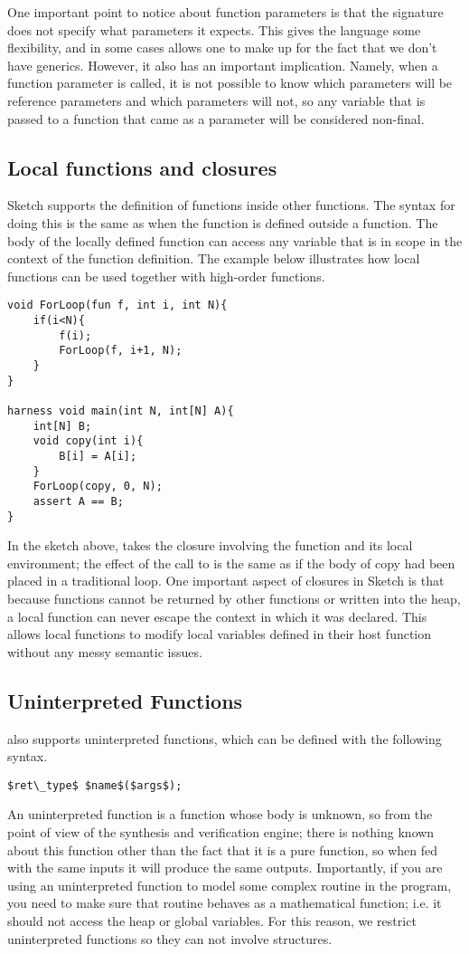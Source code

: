 One important point to notice about function parameters is that the signature does not specify what parameters it expects. This gives the language some flexibility, and in some cases allows one to make up for the fact that we don't have generics. However, it also has an important implication. Namely, when a function parameter is called, it is not possible to know which parameters will be reference parameters and which parameters will not, so any variable that is passed to a function that came as a parameter will be considered non-final.

\subsection{Local functions and closures}
Sketch supports the definition of functions inside other functions. The syntax for doing this is the same as when the function is defined outside a function. The body of the locally defined function can access any variable that is in scope in the context of the function definition. The example below illustrates how local functions can be used together with high-order functions. 

\begin{lstlisting}
void ForLoop(fun f, int i, int N){
	if(i<N){
		f(i);
		ForLoop(f, i+1, N);
	}
}

harness void main(int N, int[N] A){
	int[N] B;
	void copy(int i){
		B[i] = A[i];
	}
	ForLoop(copy, 0, N);
	assert A == B;
}
\end{lstlisting}
	
In the sketch above,  takes the closure involving the function  and its local environment; the effect of the call to  is the same as if the body of copy had been placed in a traditional  loop. 
One important aspect of closures in Sketch is that because functions cannot be returned by other functions or written into the heap, a local function can never escape the context in which it was declared. This allows local functions to modify local variables defined in their host function without any messy semantic issues.

\subsection{Uninterpreted Functions}
\Sk{} also supports uninterpreted functions, which can be defined with the following syntax.
\begin{lstlisting}
$ret\_type$ $name$($args$);
\end{lstlisting}
An uninterpreted function is a function whose body is unknown, so from the point of view of the synthesis and verification engine; there is nothing known about this function other than the fact that it is a pure function, so when fed with the same inputs it will produce the same outputs. Importantly, if you are using an uninterpreted function to model some complex routine in the program, you need to make sure that routine behaves as a mathematical function; i.e. it should not access the heap or global variables. For this reason, we restrict uninterpreted functions so they can not involve structures.


